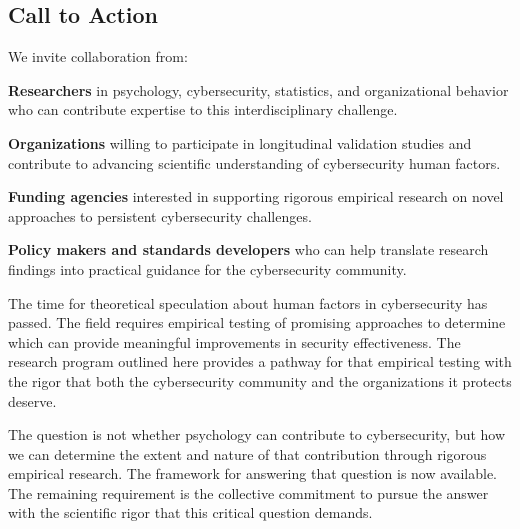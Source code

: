 \documentclass[11pt,a4paper]{article}
\begin{document}
\subsection{Call to Action}

We invite collaboration from:

\textbf{Researchers} in psychology, cybersecurity, statistics, and organizational behavior who can contribute expertise to this interdisciplinary challenge.

\textbf{Organizations} willing to participate in longitudinal validation studies and contribute to advancing scientific understanding of cybersecurity human factors.

\textbf{Funding agencies} interested in supporting rigorous empirical research on novel approaches to persistent cybersecurity challenges.

\textbf{Policy makers and standards developers} who can help translate research findings into practical guidance for the cybersecurity community.

The time for theoretical speculation about human factors in cybersecurity has passed. The field requires empirical testing of promising approaches to determine which can provide meaningful improvements in security effectiveness. The research program outlined here provides a pathway for that empirical testing with the rigor that both the cybersecurity community and the organizations it protects deserve.

The question is not whether psychology can contribute to cybersecurity, but how we can determine the extent and nature of that contribution through rigorous empirical research. The framework for answering that question is now available. The remaining requirement is the collective commitment to pursue the answer with the scientific rigor that this critical question demands.
\end{document}
